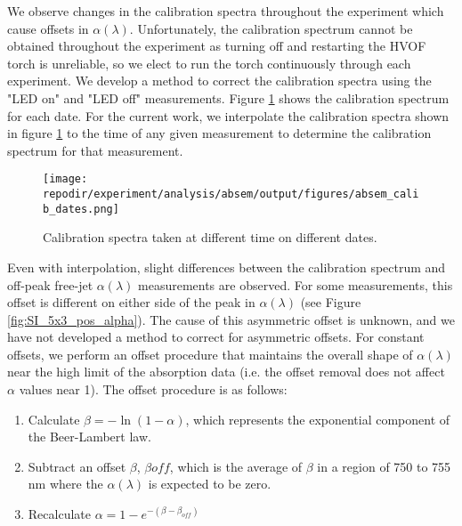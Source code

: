 We observe changes in the calibration spectra throughout the experiment which cause offsets in $\alpha(\lambda)$. Unfortunately, the calibration spectrum cannot be obtained throughout the experiment as turning off and restarting the HVOF torch is unreliable, so we elect to run the torch continuously through each experiment. We develop a method to correct the calibration spectra using the "LED on" and "LED off" measurements. Figure \ref{fig:SI_absem_calib_dates} shows the calibration spectrum for each date. For the current work, we interpolate the calibration spectra shown in figure \ref{fig:SI_absem_calib_dates} to the time of any given measurement to determine the calibration spectrum for that measurement. 

\begin{figure}[]
    \centering
    \texttt{[image: \\repodir/experiment/analysis/absem/output/figures/absem\_calib\_dates.png]}
    \caption{Calibration spectra taken at different time on different dates. }
    \label{fig:SI_absem_calib_dates}
\end{figure}


Even with interpolation, slight differences between the calibration spectrum and off-peak free-jet $\alpha(\lambda)$ measurements are observed. For some measurements, this offset is different on either side of the peak in $\alpha(\lambda)$ (see Figure \ref{fig:SI_5x3_pos_alpha}). The cause of this asymmetric offset is unknown, and we have not developed a method to correct for asymmetric offsets. For constant offsets, we perform an offset procedure that maintains the overall shape of $\alpha(\lambda)$ near the high limit of the absorption data (i.e. the offset removal does not affect $\alpha$ values near 1). The offset procedure is as follows:

\begin{enumerate}
    \item Calculate $\beta = -\ln(1 - \alpha)$, which represents the exponential component of the Beer-Lambert law. 
    \item Subtract an offset $\beta$, $\beta{off}$, which is the average of $\beta$ in a region of 750 to 755 nm where the $\alpha(\lambda)$ is expected to be zero. 
    \item Recalculate $\alpha = 1 - e^{- (\beta - \beta_{off})}$ 
\end{enumerate}

